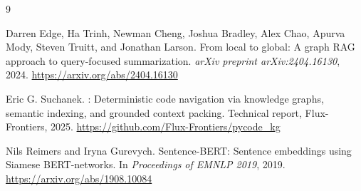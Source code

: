 \documentclass[10pt]{article}
\begin{document}
\begin{thebibliography}{9}

Darren Edge, Ha Trinh, Newman Cheng, Joshua Bradley, Alex Chao, Apurva Mody,
Steven Truitt, and Jonathan Larson.
\newblock From local to global: A graph {RAG} approach to query-focused
summarization.
\newblock \emph{arXiv preprint arXiv:2404.16130}, 2024.
\newblock \url{https://arxiv.org/abs/2404.16130}

Eric G. Suchanek.
: Deterministic code navigation via knowledge graphs,
semantic indexing, and grounded context packing.
\newblock Technical report, Flux-Frontiers, 2025.
\newblock \url{https://github.com/Flux-Frontiers/pycode\_kg}

Nils Reimers and Iryna Gurevych.
\newblock Sentence-{BERT}: Sentence embeddings using {Siamese} {BERT}-networks.
\newblock In \emph{Proceedings of EMNLP 2019}, 2019.
\newblock \url{https://arxiv.org/abs/1908.10084}

\end{thebibliography}
\end{document}
